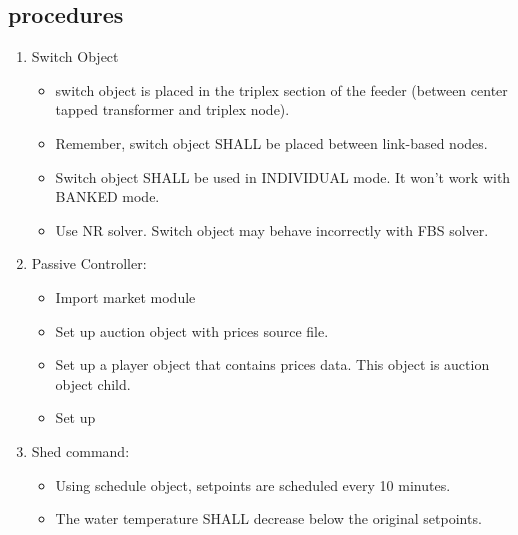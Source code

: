 \subsection{procedures}
    \begin{enumerate}
        \item Switch Object
        \begin{itemize}
            \item switch object is placed in the triplex section of the feeder (between center tapped transformer and triplex node).
            \item Remember, switch object SHALL be placed between link-based nodes. 
            \item Switch object SHALL be used in INDIVIDUAL mode. It won't work with BANKED mode.
            \item Use NR solver. Switch object may behave incorrectly with FBS solver.
        \end{itemize}
        \item Passive Controller:
        \begin{itemize}
            \item Import market module
            \item Set up auction object with prices source file.
            \item Set up a player object that contains prices data. This object is auction object child.
            \item Set up 
        \end{itemize}
        \item Shed command:
        \begin{itemize}
            \item Using schedule object, setpoints are scheduled every 10 minutes.
            \item The water temperature SHALL decrease below the original setpoints. 
        \end{itemize}
    \end{enumerate}
